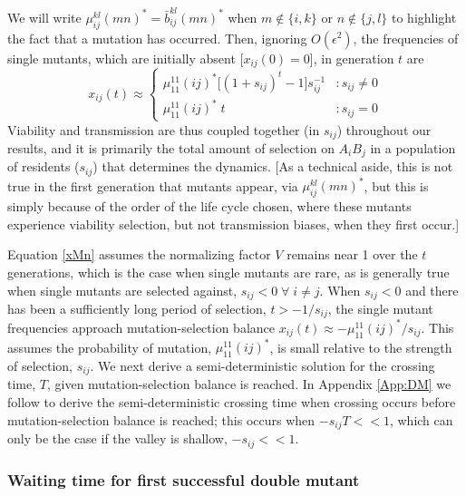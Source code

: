 \documentclass[review,3p,authoryear]{elsarticle}
\begin{document}
We will write $\mu_{ij}^{kl}(mn)^* = \bar{b}_{ij}^{kl}(mn)^*$ when $m \not\in \{i,k\}$ or $n \not\in \{j,l\}$ to highlight the fact that a mutation has occurred.
Then, ignoring $O(\epsilon^2)$, the frequencies of single mutants, which are initially absent [$x_{ij}(0)=0$], in generation $t$ are
\begin{equation}\label{xMn}
x_{ij}(t)\approx\left\{
     \begin{array}{lr}
     \mu_{11}^{11}(ij)^*\Big[ (1 + s_{ij})^t - 1\Big] s_{ij}^{-1} & : s_{ij} \neq 0\\
      \mu_{11}^{11}(ij)^* \; t & : s_{ij} = 0
     \end{array}
   \right.
\end{equation}
Viability and transmission are thus coupled together (in $s_{ij}$) throughout our results, and it is primarily the total amount of selection on $A_iB_j$ in a population of residents ($s_{ij}$) that determines the dynamics.  
[As a technical aside, this is not true in the first generation that mutants appear, via $\mu_{ij}^{kl}(mn)^*$, but this is simply because of the order of the life cycle chosen, where these mutants experience viability selection, but not transmission biases, when they first occur.]

Equation \eqref{xMn} assumes the normalizing factor $V$ remains near 1 over the $t$ generations, which is the case when single mutants are rare, as is generally true when single mutants are selected against, $s_{ij}<0 \; \forall \; i\neq j$.
When $s_{ij}<0$ and there has been a sufficiently long period of selection, $ t  > -1/s_{ij} $, the single mutant frequencies approach mutation-selection balance $x_{ij}(t) \approx - \mu_{11}^{11}(ij)^* / s_{ij}$.
This assumes the probability of mutation, $\mu_{11}^{11}(ij)^*$, is small relative to the strength of selection, $s_{ij}$.
We next derive a semi-deterministic solution for the crossing time, $T$, given mutation-selection balance is reached. 
In Appendix \ref{App:DM} we follow \cite{Christiansen1998} to derive the semi-deterministic crossing time when crossing occurs before mutation-selection balance is reached; this occurs when $-s_{ij}T<<1$, which can only be the case if the valley is shallow, $-s_{ij}<<1$.

\subsubsection{Waiting time for first successful double mutant}
\end{document}
